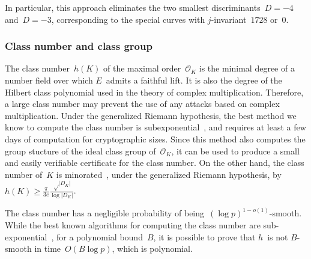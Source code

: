 \documentclass[twocolumn,letterpaper]{article}
\let\ro\mathcal
\def\abs#1{\left|#1\right|}
\def\pa#1{\left(#1\right)}
\DeclareMathOperator\Cl{Cl}
\begin{document}
In particular, this approach eliminates
the two smallest discriminants~$D = -4$ and~$D = -3$,
corresponding to the special curves with $j$-invariant~$1728$ or~$0$.

\subsubsection{Class number and class group}
\label{sss:class-group}

The class number~$h(K)$ of the maximal order~$\ro O_K$
is the minimal degree of a number field
over which $E$~admits a faithful lift.
It is also the degree of the Hilbert class polynomial
used in the theory of complex multiplication.
Therefore, a large class number may prevent the use
of any attacks based on complex multiplication.
Under the generalized Riemann hypothesis,
the best method we know to compute the class number
is subexponential~\cite{ams1989hmc,chile2009biasse},
and requires at least a few days of computation for cryptographic sizes.
Since this method also computes the group stucture
of the ideal class group of~$\ro O_K$,
it can be used to produce a small and easily verifiable certificate
for the class number.
On the other hand,
the class number of~$K$ is minorated~\cite{cras1990louboutin},
under the generalized Riemann hypothesis,
by~$h(K) ≥ \frac{π}{3e} \frac{√{\abs{D_K}}}{\log \abs{D_K}}$.

\medbreak

The class number has a negligible probability
of being~$(\log p)^{1-o(1)}$-smooth.
While the best known algorithms for computing the class number
are sub-exponential~\cite{ams1989hmc,chile2009biasse},
for a polynomial bound~$B$,
it is possible to prove that $h$~is not $B$-smooth
in time~$O(B \log p)$, which is polynomial.
\end{document}
